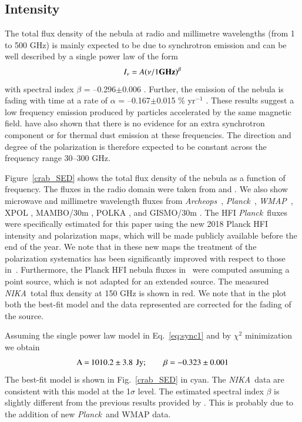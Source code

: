 \documentclass[twocolumn,traditabstract]{aa}
\def\NIKA{\textit{NIKA}}
\def\Archeops{\textit{Archeops}}
\def\Planck{\textit{Planck}}
\def\WMAP{\textit{WMAP}}
\begin{document}
\subsection{Intensity}
The total flux density of the  nebula at radio and millimetre
wavelengths (from 1 to 500 GHz) is mainly expected to be due to synchrotron emission and can be
well described by a single power law of the form
\begin{equation}
I_{\nu} = A(\nu / 1 {\bf GHz})^{\beta}
\label{eq:sync1}
\end{equation}
with spectral index $\beta$ = --0.296$\pm$0.006 \citep{baars1977absolute,macias2010}. Further, the emission of the  nebula is fading with time at a rate of $\alpha$ = --0.167$\pm$0.015 \% yr$^{-1}$ \citep{aller1985decrease}. 
These results suggest a low frequency emission produced by particles accelerated by the same magnetic field. \cite{macias2010} have also shown  that there is no evidence for an extra synchrotron component or for thermal dust emission at these frequencies. The direction and degree of the polarization is therefore expected to be constant across the frequency range 30--300 GHz.

Figure~\ref{crab_SED} shows the total flux density of the  nebula as a function of frequency. The fluxes in the radio domain were taken from \cite{dmitrenko1970absolute} and \cite{1971IzVUZ..14..157V}. We also show microwave and millimetre wavelength fluxes from \Archeops\ \citep{macias2007archeops}, \Planck\ \citep{2015arXiv150702058P}, \WMAP\ \citep{2011ApJS..192...19W}, XPOL \citep{aumont2010}, MAMBO/30m \citep{2002A&A...386.1044B}, POLKA \citep{2014PASP..126.1027W}, and GISMO/30m \citep{2011ApJ...734...54A}. 
The HFI \Planck\ fluxes were specifically estimated for this paper using the new
2018 Planck HFI intensity and polarization maps, which will be made publicly available before
the end of the year. We note that in these new maps the treatment of the polarization systematics has been significantly improved with respect to those in~\cite{2015arXiv150702058P}. Furthermore, the Planck HFI  nebula fluxes in~\cite{2015arXiv150702058P} were computed assuming a point source, which is not adapted
for an extended source.
The measured \NIKA\ total flux density at 150 GHz is shown in red.  We note that in the plot both the best-fit model and the data represented are corrected for the fading of the source.

Assuming the single power law model in Eq.~\ref{eq:sync1} and
by $\chi^2$ minimization we obtain
$$\setlength\arraycolsep{0.1em}
 \begin{array}{rclcl}
  \textrm{A}&=& 1010.2\pm3.8 & & \textrm{Jy}; \quad \quad  \textrm{$\beta$} = - 0.323\pm0.001\\
 \end{array}
$$
The best-fit model is shown in Fig.~\ref{crab_SED} in cyan.
The \NIKA\ data are consistent with this model at the 1$\sigma$ level.
The estimated spectral index $\beta$ is slightly different from the previous results provided by \cite{macias2010}. This 
is probably due to the addition of new \Planck\ and  WMAP data.
\end{document}
